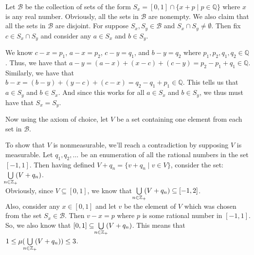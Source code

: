 \documentclass{book}
\newcommand{\pracTwo}{
   \color{Orange}%
   \fontsize{12}{14}\selectfont%
}
\newenvironment{myIndent}{%
   \begin{adjustwidth}{2.5em}{0em}%
}{%
   \end{adjustwidth}%
}
\newcommand{\retTwo}{\hfill\bigbreak}
\begin{document}
   \begin{myIndent}\pracTwo
      Let $\mathcal{B}$ be the collection of sets of the form $S_x = [0, 1] \cap \{x + p \mid p \in \mathbb{Q}\}$ where $x$ is any real number. Obviously, all the sets in $\mathcal{B}$ are nonempty. We also claim that all the sets in $\mathcal{B}$ are disjoint. For suppose $S_x, S_y \in \mathcal{B}$ and $S_x \cap S_y \neq \emptyset$. Then fix $c \in S_x \cap S_y$ and consider any $a \in S_x$ and $b \in S_y$.\retTwo

      We know $c - x = p_1$, $a - x = p_2$, $c - y = q_1$, and $b - y = q_2$ where $p_1, p_2, q_1, q_2 \in \mathbb{Q}$. Thus, we have that $a - y = (a - x) + (x - c) + (c - y) = p_2 - p_1 + q_1 \in \mathbb{Q}$. Similarly, we have that $b - x = (b - y) + (y - c) + (c - x) = q_2 - q_1 + p_1 \in \mathbb{Q}$. This tells us that $a \in S_y$ and $b \in S_x$. And since this works for all $a \in S_x$ and $b \in S_y$, we thus must have that $S_x = S_y$.\retTwo

      Now using the axiom of choice, let $V$ be a set containing one element from each set in $\mathcal{B}$.\retTwo

      To show that $V$ is nonmeasurable, we'll reach a contradiction by supposing $V$ is\\ measurable. Let $q_1, q_2, \ldots$ be an enumeration of all the rational numbers in the set $[-1, 1]$. Then having defined $V + q_n = \{v + q_n \mid v \in V\}$, consider the set: $\hspace{-0.3em}\bigcup\limits_{n \in \mathbb{Z}_+}\hspace{-0.3em}(V + q_n)$.\\

      Obviously, since $V \subseteq [0,1]$, we know that $\hspace{-0.3em}\bigcup\limits_{n \in \mathbb{Z}_+}\hspace{-0.3em}(V + q_n) \subseteq [-1, 2]$.\\

      Also, consider any $x \in [0, 1]$ and let $v$ be the element of $V$ which was chosen from the set $S_x \in \mathcal{B}$. Then $v - x = p$ where $p$ is some rational number in $[-1, 1]$. So, we also know that $[0, 1] \subseteq \hspace{-0.3em}\bigcup\limits_{n \in \mathbb{Z}_+}\hspace{-0.3em}(V + q_n)$. This means that $1 \leq \mu(\hspace{-0.3em}\bigcup\limits_{n \in \mathbb{Z}_+}\hspace{-0.3em}(V + q_n)) \leq 3$.\\


\end{myIndent}
\end{document}
